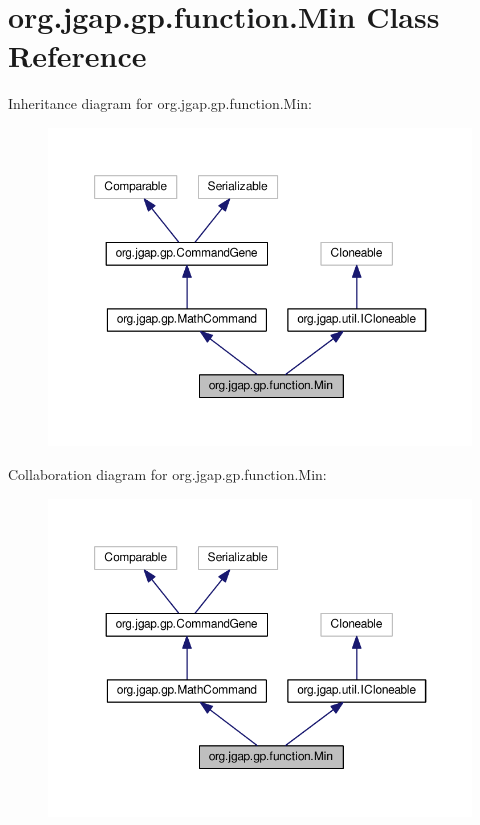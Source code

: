 \hypertarget{classorg_1_1jgap_1_1gp_1_1function_1_1_min}{\section{org.\-jgap.\-gp.\-function.\-Min Class Reference}
\label{classorg_1_1jgap_1_1gp_1_1function_1_1_min}
}


Inheritance diagram for org.\-jgap.\-gp.\-function.\-Min\-:
\nopagebreak
\begin{figure}[H]
\begin{center}
\leavevmode
\includegraphics[width=350pt]{classorg_1_1jgap_1_1gp_1_1function_1_1_min__inherit__graph}
\end{center}
\end{figure}


Collaboration diagram for org.\-jgap.\-gp.\-function.\-Min\-:
\nopagebreak
\begin{figure}[H]
\begin{center}
\leavevmode
\includegraphics[width=350pt]{classorg_1_1jgap_1_1gp_1_1function_1_1_min__coll__graph}
\end{center}
\end{figure}
